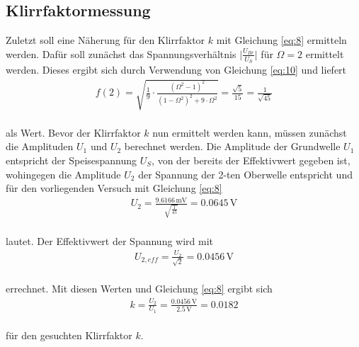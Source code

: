 \subsection{Klirrfaktormessung}

Zuletzt soll eine Näherung für den Klirrfaktor $k$ mit Gleichung \ref{eq:8} ermitteln werden.
Dafür soll zunächst das Spannungsverhältnis $\lvert{\frac{U_{Br}}{U_S}}\rvert$ für $\Omega = 2$ ermittelt werden. Dieses ergibt sich 
durch Verwendung von Gleichung \ref{eq:10} und liefert 
\begin{align}
f(2) =  \sqrt{\frac{1}{9} \cdot \frac{(\Omega^2 - 1)^2}{(1 - \Omega^2)^2 + 9 \cdot \Omega^2}}  = \frac{\sqrt{5}}{15} = \frac{1}{\sqrt{45}} \nonumber
\end{align}
\\
als Wert. Bevor der Klirrfaktor $k$ nun ermittelt werden kann, müssen zunächst die Amplituden $U_{1}$ und $U_{2}$ berechnet werden.
Die Amplitude der Grundwelle $U_{1}$ entspricht der Speisespannung $U_{S}$, von der bereits der Effektivwert gegeben ist, wohingegen die Amplitude $U_{2}$ der Spannung der
2-ten Oberwelle entspricht und für den vorliegenden Versuch mit Gleichung \ref{eq:8}
\begin{align}
U_{2} = \frac{9.6166\, \si{\milli\volt}}{\sqrt{\frac{1}{45}}} = 0.0645\, \si{\volt} \nonumber
\end{align}
\\
lautet. Der Effektivwert der Spannung wird mit 
\begin{align}
U_{2,eff} = \frac{U_{2}}{\sqrt{2}} = 0.0456\, \si{\volt} \nonumber
\end{align}
\\
errechnet.
Mit diesen Werten und Gleichung \ref{eq:8} ergibt sich 
\begin{align}
k = \frac{U_{2}}{U_{1}} = \frac{0.0456\, \si{\volt}}{2.5\, \si{\volt}} = 0.0182 \nonumber
\end{align}
\\ 
für den gesuchten Klirrfaktor $k$.